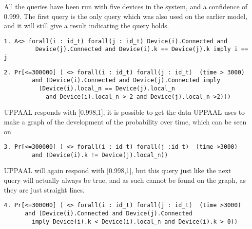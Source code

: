 All the queries have been run with five devices in the system, and a confidence of 0.999.
The first query is the only query which was also used on the earlier model, and it will still give a result indicating the query holds.

\begin{lstlisting}[style=UPPAAL, title={This query requires that eventually if all devices are connected, then no pair of devices have the same \texttt{k}, unless the pair consists of the same two devices.}]
1. A<> forall(i : id_t) forall(j : id_t) Device(i).Connected and
         Device(j).Connected and Device(i).k == Device(j).k imply i == j
\end{lstlisting}


\begin{lstlisting}[style=UPPAAL, title={This query asks after 3000 UPPAAL time units has passed, what then is the probability that if two devices \texttt{i}, and \texttt{j} are connected to a network that  their local values of \texttt{n} are the same, and that they are both larger than 2. The query will keep checking the probability until it has been found to be 100\% certain or until 300000 UPPAAL time units has passed.}]
2. Pr[<=300000] ( <> forall(i : id_t) forall(j : id_t)  (time > 3000) 
	  	and (Device(i).Connected and Device(j).Connected imply 
	  	  (Device(i).local_n == Device(j).local_n 
	  		and Device(i).local_n > 2 and Device(j).local_n >2)))
\end{lstlisting}
\noindent
UPPAAL responds with [0.998,1], it is possible to get the data UPPAAL uses to make a graph of the development of the probability over time, which can be seen on 


\begin{lstlisting}[style=UPPAAL, title={This query asks after 3000 UPPAAL time units has passed, what then is the probability that a device \texttt{i} has a value \texttt{k} which is different from a device \texttt{j}s value of \texttt{n}}]
3. Pr[<=300000] ( <> forall(i : id_t) forall(j :id_t)  (time >3000) 
		and (Device(i).k != Device(j).local_n))
\end{lstlisting}
UPPAAL will again respond with [0.998,1], but this query just like the next query will actually always be true, and as such cannot be found on the graph, as they are just straight lines.

\begin{lstlisting}[style=UPPAAL, title={This query asks after 3000 UPPAAL time units has passed, what then is the probability that if a device \texttt{i} and a device \texttt{j} is both connected that then \texttt{i}'s values of \texttt{k} will be larger than zero and smaller than \texttt{n}}]
4. Pr[<=300000] ( <> forall(i : id_t) forall(j : id_t)  (time >3000) 
	  and (Device(i).Connected and Device(j).Connected 
	  	imply Device(i).k < Device(i).local_n and Device(i).k > 0))
\end{lstlisting}


